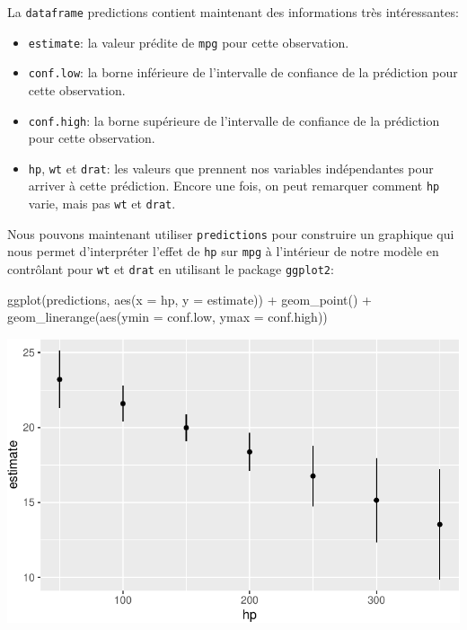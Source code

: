 \documentclass[
  letterpaper,
  DIV=11,
  numbers=noendperiod]{scrreprt}
\newenvironment{Shaded}{\begin{snugshade}}{\end{snugshade}}
\newcommand{\AttributeTok}[1]{\textcolor[rgb]{0.40,0.45,0.13}{#1}}
\newcommand{\FunctionTok}[1]{\textcolor[rgb]{0.28,0.35,0.67}{#1}}
\newcommand{\NormalTok}[1]{\textcolor[rgb]{0.00,0.23,0.31}{#1}}
\newcommand{\SpecialCharTok}[1]{\textcolor[rgb]{0.37,0.37,0.37}{#1}}
\providecommand{\tightlist}{%
  \setlength{\itemsep}{0pt}\setlength{\parskip}{0pt}}\usepackage{longtable,booktabs,array}
\begin{document}
La \texttt{dataframe} predictions contient maintenant des informations
très intéressantes:

\begin{itemize}
\tightlist
\item
  \texttt{estimate}: la valeur prédite de \texttt{mpg} pour cette
  observation.
\item
  \texttt{conf.low}: la borne inférieure de l'intervalle de confiance de
  la prédiction pour cette observation.
\item
  \texttt{conf.high}: la borne supérieure de l'intervalle de confiance
  de la prédiction pour cette observation.
\item
  \texttt{hp}, \texttt{wt} et \texttt{drat}: les valeurs que prennent
  nos variables indépendantes pour arriver à cette prédiction. Encore
  une fois, on peut remarquer comment \texttt{hp} varie, mais pas
  \texttt{wt} et \texttt{drat}.
\end{itemize}

Nous pouvons maintenant utiliser \texttt{predictions} pour construire un
graphique qui nous permet d'interpréter l'effet de \texttt{hp} sur
\texttt{mpg} à l'intérieur de notre modèle en contrôlant pour
\texttt{wt} et \texttt{drat} en utilisant le package \texttt{ggplot2}:

\begin{Shaded}
\begin{Highlighting}[]
\FunctionTok{ggplot}\NormalTok{(predictions, }\FunctionTok{aes}\NormalTok{(}\AttributeTok{x =}\NormalTok{ hp, }\AttributeTok{y =}\NormalTok{ estimate)) }\SpecialCharTok{+}
      \FunctionTok{geom\_point}\NormalTok{() }\SpecialCharTok{+}
      \FunctionTok{geom\_linerange}\NormalTok{(}\FunctionTok{aes}\NormalTok{(}\AttributeTok{ymin =}\NormalTok{ conf.low, }\AttributeTok{ymax =}\NormalTok{ conf.high))}
\end{Highlighting}
\end{Shaded}

\includegraphics{chapitre_6_files/figure-pdf/unnamed-chunk-11-1.pdf}
\end{document}
